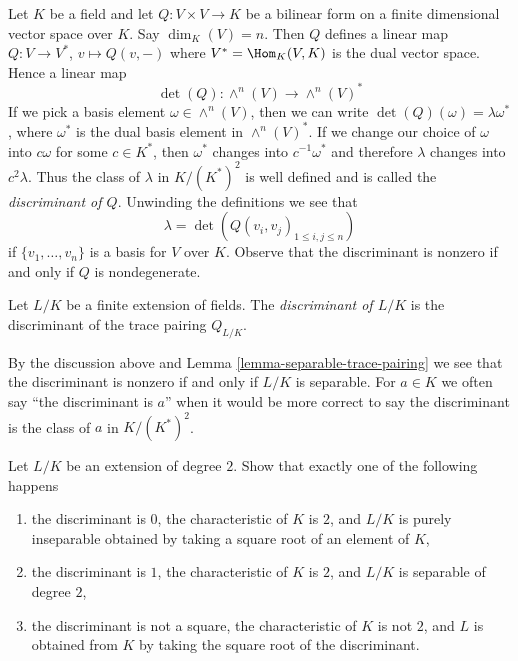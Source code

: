 \noindent
Let $K$ be a field and let $Q : V \times V \to K$ be a bilinear form
on a finite dimensional vector space over $K$. Say $\dim_K(V) = n$.
Then $Q$ defines a linear map $Q : V \to V^*$, $v \mapsto Q(v, -)$
where $V^* = \Hom_K(V, K)$ is the dual vector space. Hence a linear map
$$
\det(Q) : \wedge^n(V) \longrightarrow \wedge^n(V)^*
$$
If we pick a basis element $\omega \in \wedge^n(V)$, then we can
write $\det(Q)(\omega) = \lambda \omega^*$, where $\omega^*$
is the dual basis element in $\wedge^n(V)^*$. If we change our
choice of $\omega$ into $c \omega$ for some $c \in K^*$, then
$\omega^*$ changes into $c^{-1} \omega^*$ and therefore
$\lambda$ changes into $c^2 \lambda$. Thus the class of
$\lambda$ in $K/(K^*)^2$ is well defined and is called the
{\it discriminant of $Q$}. Unwinding the definitions we see that
$$
\lambda = \det(Q(v_i, v_j)_{1 \leq i, j \leq n})
$$
if $\{v_1, \ldots, v_n\}$ is a basis for $V$ over $K$. Observe that
the discriminant is nonzero if and only if $Q$ is nondegenerate.

\begin{definition}
\label{definition-discriminant}
Let $L/K$ be a finite extension of fields. The
{\it discriminant of $L/K$} is the discriminant of
the trace pairing $Q_{L/K}$.
\end{definition}

\noindent
By the discussion above and Lemma \ref{lemma-separable-trace-pairing}
we see that the discriminant is nonzero if and only
if $L/K$ is separable. For $a \in K$ we often say
``the discriminant is $a$'' when it would be more correct
to say the discriminant is the class of $a$ in $K/(K^*)^2$.

\begin{exercise}
\label{exercise-quadratic-discriminant}
Let $L/K$ be an extension of degree $2$. Show that exactly
one of the following happens
\begin{enumerate}
\item the discriminant is $0$, the characteristic of $K$ is $2$,
and $L/K$ is purely inseparable obtained by taking a square root
of an element of $K$,
\item the discriminant is $1$, the characteristic of $K$ is $2$, and
$L/K$ is separable of degree $2$,
\item the discriminant is not a square, the characteristic of $K$
is not $2$, and $L$ is obtained from $K$ by taking the square root
of the discriminant.
\end{enumerate}
\end{exercise}











